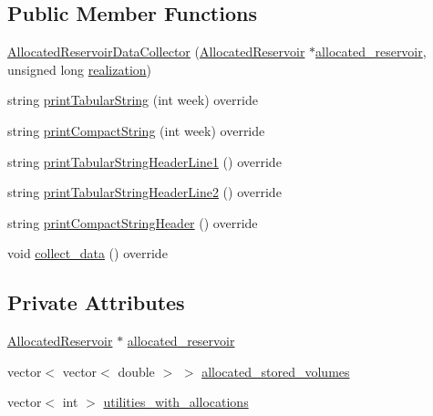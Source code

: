 \subsection*{Public Member Functions}
\begin{DoxyCompactItemize}
\item 
\mbox{\hyperlink{classAllocatedReservoirDataCollector_a512b8604164f43d08f961e0f433678e3_a512b8604164f43d08f961e0f433678e3}{Allocated\+Reservoir\+Data\+Collector}} (\mbox{\hyperlink{classAllocatedReservoir}{Allocated\+Reservoir}} $\ast$\mbox{\hyperlink{classAllocatedReservoirDataCollector_a8ba7549c1a0ec6afc6c87e264d2826e3_a8ba7549c1a0ec6afc6c87e264d2826e3}{allocated\+\_\+reservoir}}, unsigned long \mbox{\hyperlink{classDataCollector_a9ef2887466fe3123aa19ef956a219b96_a9ef2887466fe3123aa19ef956a219b96}{realization}})
\item 
string \mbox{\hyperlink{classAllocatedReservoirDataCollector_ae5a9aa9b2a3cffd8f5ffe983c8fcf6c8_ae5a9aa9b2a3cffd8f5ffe983c8fcf6c8}{print\+Tabular\+String}} (int week) override
\item 
string \mbox{\hyperlink{classAllocatedReservoirDataCollector_a35f8125d428e65c737ff3360ae9bd0cd_a35f8125d428e65c737ff3360ae9bd0cd}{print\+Compact\+String}} (int week) override
\item 
string \mbox{\hyperlink{classAllocatedReservoirDataCollector_ae82c7a68af1dce9003cccc6da1800e28_ae82c7a68af1dce9003cccc6da1800e28}{print\+Tabular\+String\+Header\+Line1}} () override
\item 
string \mbox{\hyperlink{classAllocatedReservoirDataCollector_a30d8c59205862822f6548472ba62e537_a30d8c59205862822f6548472ba62e537}{print\+Tabular\+String\+Header\+Line2}} () override
\item 
string \mbox{\hyperlink{classAllocatedReservoirDataCollector_adbedebdf593bee81447671fb8f6ef2fe_adbedebdf593bee81447671fb8f6ef2fe}{print\+Compact\+String\+Header}} () override
\item 
void \mbox{\hyperlink{classAllocatedReservoirDataCollector_a8ef8451d2cc6eb01b205eee75ab93729_a8ef8451d2cc6eb01b205eee75ab93729}{collect\+\_\+data}} () override
\end{DoxyCompactItemize}
\subsection*{Private Attributes}
\begin{DoxyCompactItemize}
\item 
\mbox{\hyperlink{classAllocatedReservoir}{Allocated\+Reservoir}} $\ast$ \mbox{\hyperlink{classAllocatedReservoirDataCollector_a8ba7549c1a0ec6afc6c87e264d2826e3_a8ba7549c1a0ec6afc6c87e264d2826e3}{allocated\+\_\+reservoir}}
\item 
vector$<$ vector$<$ double $>$ $>$ \mbox{\hyperlink{classAllocatedReservoirDataCollector_a2bb0db4f265998a9bbe710a8e97f481b_a2bb0db4f265998a9bbe710a8e97f481b}{allocated\+\_\+stored\+\_\+volumes}}
\item 
vector$<$ int $>$ \mbox{\hyperlink{classAllocatedReservoirDataCollector_ac5b879439204459a7362751139636643_ac5b879439204459a7362751139636643}{utilities\+\_\+with\+\_\+allocations}}
\end{DoxyCompactItemize}
